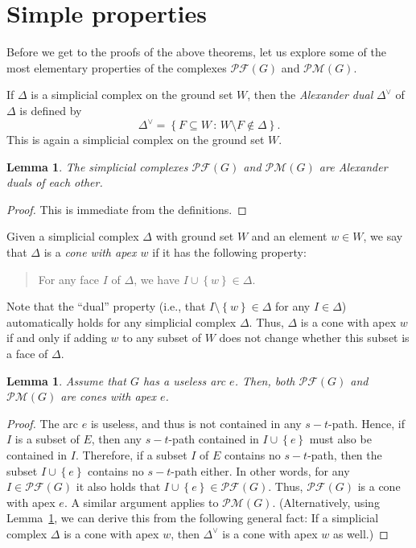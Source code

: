 \documentclass[12pt]{amsart}
\newtheorem{lemma}[theorem]{Lemma}
\theoremstyle{definition}
\newenvironment{statement}{\begin{quote}}{\end{quote}}
\newcommand{\with}{\,\colon\,}
\newcommand{\set}[1]{\left\{ #1 \right\}}
\newcommand{\Pm}[1]{\mathcal{PM}\left(#1\right)}
\newcommand{\Pf}[1]{\mathcal{PF}\left(#1\right)}
\begin{document}
\section{Simple properties}

Before we get to the proofs of the above theorems, let us explore some of the most elementary properties of the complexes $\Pf{G}$ and $\Pm{G}$.

If $\Delta$ is a simplicial complex on the ground set $W$, then the \emph{Alexander dual} $\Delta^\vee$ of $\Delta$ is defined by
\[ \Delta^\vee = \set{ F \subseteq W \with W \setminus F \notin \Delta} . \]
This is again a simplicial complex on the ground set $W$.

\begin{lemma} \label{lem.duals}
    The simplicial complexes $\Pf{G}$ and $\Pm{G}$ are Alexander duals of each other.
\end{lemma}
\begin{proof}
    This is immediate from the definitions.
\end{proof}


Given a simplicial complex $\Delta$ with ground set $W$ and an element $w \in W$, we say that $\Delta$ is a \emph{cone with apex $w$} if it has the following property:
\begin{statement}
    For any face $I$ of $\Delta$, we have $I \cup \set{w} \in \Delta$.
\end{statement}
Note that the ``dual'' property (i.e., that $I \setminus \set{w} \in \Delta$ for any $I \in \Delta$) automatically holds for any simplicial complex $\Delta$.
Thus, $\Delta$ is a cone with apex $w$ if and only if adding $w$ to any subset of $W$ does not change whether this subset is a face of $\Delta$.

\begin{lemma}\label{lem:dumbarc}
    Assume that $G$ has a useless arc $e$.
    Then, both $\Pf{G}$ and $\Pm{G}$ are cones with apex $e$.
\end{lemma}
\begin{proof}
    The arc $e$ is useless, and thus is not contained in any $s-t$-path.
    Hence, if $I$ is a subset of $E$, then any $s-t$-path contained in
    $I \cup \set{e}$ must also be contained in $I$.
    Therefore, if a subset $I$ of $E$ contains no $s-t$-path, then the
    subset $I \cup \set{e}$ contains no $s-t$-path either.
    In other words, for any $I \in \Pf{G}$ it also holds that $I \cup\set{e} \in \Pf{G}$.
    Thus, $\Pf{G}$ is a cone with apex $e$.
    A similar argument applies to $\Pm{G}$.
    (Alternatively, using Lemma~\ref{lem.duals}, we can derive this from the following general fact:
    If a simplicial complex $\Delta$ is a cone with apex $w$, then $\Delta^\vee$ is a cone with apex $w$ as well.)
\end{proof}
\end{document}
